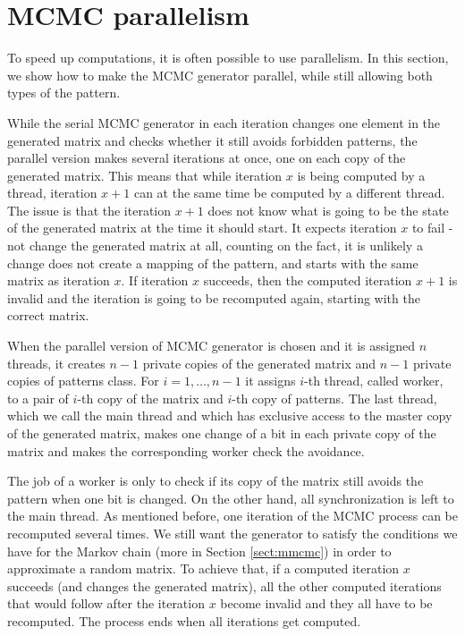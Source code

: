 \section{MCMC parallelism}
\label{sect:parallel}
To speed up computations, it is often possible to use parallelism. In this section, we show how to make the MCMC generator parallel, while still allowing both types of the pattern.

While the serial MCMC generator in each iteration changes one element in the generated matrix and checks whether it still avoids forbidden patterns, the parallel version makes several iterations at once, one on each copy of the generated matrix. This means that while iteration $x$ is being computed by a thread, iteration $x+1$ can at the same time be computed by a different thread. The issue is that the iteration $x+1$ does not know what is going to be the state of the generated matrix at the time it should start. It expects iteration $x$ to fail - not change the generated matrix at all, counting on the fact, it is unlikely a change does not create a mapping of the pattern, and starts with the same matrix as iteration $x$. If iteration $x$ succeeds, then the computed iteration $x+1$ is invalid and the iteration is going to be recomputed again, starting with the correct matrix.

When the parallel version of MCMC generator is chosen and it is assigned $n$ threads, it creates $n-1$ private copies of the generated matrix and $n-1$ private copies of patterns class. For $i=1,\dots,n-1$ it assigns $i$-th thread, called worker, to a pair of $i$-th copy of the matrix and $i$-th copy of patterns. The last thread, which we call the main thread and which has exclusive access to the master copy of the generated matrix, makes one change of a bit in each private copy of the matrix and makes the corresponding worker check the avoidance.

The job of a worker is only to check if its copy of the matrix still avoids the pattern when one bit is changed. On the other hand, all synchronization is left to the main thread. As mentioned before, one iteration of the MCMC process can be recomputed several times. We still want the generator to satisfy the conditions we have for the Markov chain (more in Section \ref{sect:mmcmc}) in order to approximate a random matrix. To achieve that, if a computed iteration $x$ succeeds (and changes the generated matrix), all the other computed iterations that would follow after the iteration $x$ become invalid and they all have to be recomputed. The process ends when all iterations get computed.

